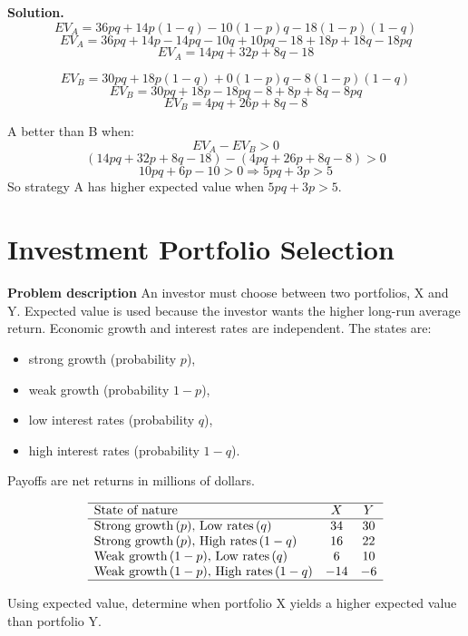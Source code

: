 \begin{ExamProblems}
		\textbf{Solution.}
		\[
		EV_A=36pq+14p(1-q)-10(1-p)q-18(1-p)(1-q)
		\]
		\[
		EV_A=36pq+14p-14pq-10q+10pq-18+18p+18q-18pq
		\]
		\[
		EV_A=14pq+32p+8q-18
		\]
		
		\[
		EV_B=30pq+18p(1-q)+0(1-p)q-8(1-p)(1-q)
		\]
		\[
		EV_B=30pq+18p-18pq-8+8p+8q-8pq
		\]
		\[
		EV_B=4pq+26p+8q-8
		\]
		
		A better than B when:
		\[
		EV_A-EV_B>0
		\]
		\[
		(14pq+32p+8q-18)-(4pq+26p+8q-8)>0
		\]
		\[
		10pq+6p-10>0\Rightarrow 5pq+3p>5
		\]
		So strategy A has higher expected value when \(5pq+3p>5\).
		
		
		\hypertarget{c7-cu-ex10}{}
		\item
		\section{Investment Portfolio Selection}
		
		\textbf{Problem description}
		An investor must choose between two portfolios, X and Y. Expected value is used because the investor wants the higher long-run average return. Economic growth and interest rates are independent. The states are:
		\begin{itemize}
			\item strong growth (probability \(p\)),
			\item weak growth (probability \(1-p\)),
			\item low interest rates (probability \(q\)),
			\item high interest rates (probability \(1-q\)).
		\end{itemize}
		Payoffs are net returns in millions of dollars.
		
		\[
		\begin{array}{lcc}
			\hline
			\text{State of nature} & X & Y \\
			\hline
			\text{Strong growth}\,(p),\,\text{Low rates}\,(q) & 34 & 30 \\
			\text{Strong growth}\,(p),\,\text{High rates}\,(1-q) & 16 & 22 \\
			\text{Weak growth}\,(1-p),\,\text{Low rates}\,(q) & 6 & 10 \\
			\text{Weak growth}\,(1-p),\,\text{High rates}\,(1-q) & -14 & -6 \\
			\hline
		\end{array}
		\]
		
		Using expected value, determine when portfolio X yields a higher expected value than portfolio Y.
		

\end{ExamProblems}
